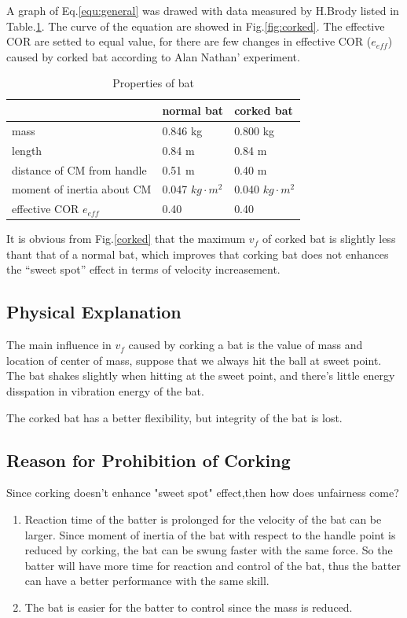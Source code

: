 \documentclass[12pt]{article}
\begin{document}
A graph of Eq.\ref{equ:general} was drawed with data measured by H.Brody\cite{H.Brody1990} listed in Table.\ref{tab:corked}.
The curve of the equation are showed in Fig.\ref{fig:corked}.
The effective COR are setted to equal value, for there are few changes in effective COR ($e_{eff}$)  caused by corked bat
according to Alan Nathan' experiment\cite{NathanDecember12004}.

\begin{centering}
\begin{table}
\centering
\caption{Properties of bat}\label{tab:corked}
\begin{tabular}{lll}
 \hline
        &normal bat & corked bat\\
 \hline
 mass&0.846 kg & 0.800 kg\\
 length&0.84 m & 0.84 m\\
 distance of CM from handle &0.51 m & 0.40 m\\
 moment of inertia about CM&0.047 $kg\cdot m^2$ & 0.040 $kg\cdot m^2$\\
 effective COR $e_{eff}$&0.40 & 0.40\\
 \hline
\end{tabular}
\end{table}
\end{centering}


It is obvious from Fig.\ref{corked} that the maximum $v_f$ of corked bat is slightly less thant that of a normal bat, which improves that corking bat does not enhances the ``sweet spot'' effect in terms of velocity increasement.

\subsection{Physical Explanation}

The main influence in $v_f$ caused by corking a bat is the value of mass
and location of center of mass,
suppose that we always hit the ball at sweet point.
The bat shakes slightly when hitting at the sweet point,
and there's little energy disspation in vibration energy of the bat.

The corked bat has a better flexibility,
but integrity of the bat is lost.

\subsection{Reason for Prohibition of Corking}
Since corking doesn't enhance "sweet spot" effect,then how does unfairness come?
\begin{enumerate}
\item Reaction time of the batter is prolonged for the velocity of the bat can be larger. Since
moment of inertia of the bat with respect to the handle point is reduced by corking, the
bat can be swung faster with the same force. So the batter will have more time for reaction and control of the bat, thus the batter can have a better performance with the same skill.
\item The bat is easier for the batter to control since the mass is reduced.
\end{enumerate}
\end{document}
